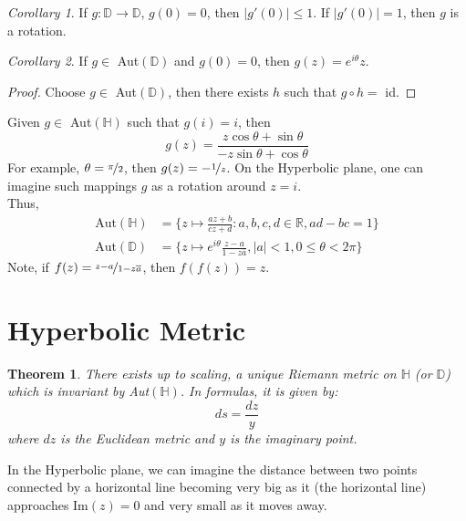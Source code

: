 \documentclass[a4paper, 11pt]{book}
\newtheorem{theorem}{Theorem}
\theoremstyle{definition}
\theoremstyle{remark}
\newtheorem{corollary}{Corollary}[theorem]
\begin{document}
    \begin{corollary}
        If $g:\mathbb{D}\to\mathbb{D}$, $g(0)=0$, then $|g'(0)|\leq 1$. If $|g'(0)|=1$, then $g$ is a rotation.
    \end{corollary}

    \begin{corollary}
        If $g\in$ Aut$(\mathbb{D})$ and $g(0)=0$, then $g(z) = e^{i\theta}z$.
    \end{corollary}
    \begin{proof}
        Choose $g\in$ Aut$(\mathbb{D})$, then there exists $h$ such that $g\circ h =$ id.
    \end{proof}

    Given $g\in$ Aut$(\mathbb{H})$ such that $g(i) = i$, then
    \[ g(z) = \frac{z\cos{\theta}+\sin{\theta}}{-z\sin{\theta}+\cos{\theta}} \]
    For example, $\theta = \nicefrac{\pi}{2}$, then $g(z) = -\nicefrac{1}{z}$. On the Hyperbolic plane, one can imagine
    such mappings $g$ as a rotation around $z=i$.\\

    Thus,
    \begin{align*}
        \text{Aut}(\mathbb{H}) &= \{z\mapsto \frac{az+b}{cz+d}:a,b,c,d\in\mathbb{R},ad-bc=1\} \\
        \text{Aut}(\mathbb{D}) &= \{z\mapsto e^{i\theta}\frac{z-a}{1-z\overline{a}},|a|<1,0\leq\theta<2\pi\}
    \end{align*}
    Note, if $f(z) = \nicefrac{z-a}{1-z\overline{a}}$, then $f(f(z)) = z$.\\

    \section{Hyperbolic Metric}

    \begin{theorem}
        There exists up to scaling, a \textit{unique} Riemann metric on $\mathbb{H}$ (or $\mathbb{D}$) which is invariant by 
        Aut$(\mathbb{H})$. In formulas, it is given by:
        \[ ds = \frac{dz}{y} \]
        where $dz$ is the Euclidean metric and $y$ is the imaginary point.
    \end{theorem}

    In the Hyperbolic plane, we can imagine the distance between two points connected by a horizontal line becoming very big
    as it (the horizontal line) approaches Im$(z) = 0$ and very small as it moves away.\\
\end{document}
